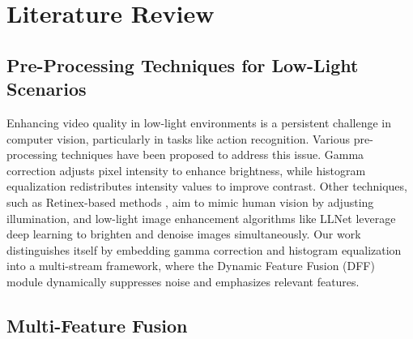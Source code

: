 \section{Literature Review}
\subsection{Pre-Processing Techniques for Low-Light Scenarios}

Enhancing video quality in low-light environments is a persistent challenge in computer vision, particularly in tasks like action recognition. Various pre-processing techniques have been proposed to address this issue. Gamma correction \cite{poynton2012digital} adjusts pixel intensity to enhance brightness, while histogram equalization \cite{trahanias1992color} redistributes intensity values to improve contrast. Other techniques, such as Retinex-based methods \cite{rahman1996multi}, aim to mimic human vision by adjusting illumination, and low-light image enhancement algorithms like LLNet \cite{lore2017llnet} leverage deep learning to brighten and denoise images simultaneously. %
Our work distinguishes itself by embedding gamma correction and histogram equalization into a multi-stream framework, where the Dynamic Feature Fusion (DFF) module dynamically suppresses noise and emphasizes relevant features. 

\subsection{Multi-Feature Fusion}

